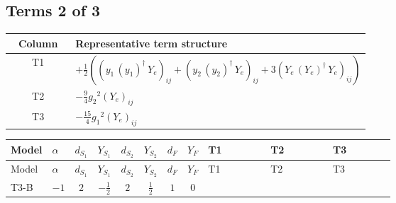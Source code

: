 \documentclass[8pt]{article}
\begin{document}
\begin{landscape}
\subsection*{Terms 2 of 3}
\begin{center}
\begin{tabular}{@{}c >{\raggedright\arraybackslash}p{0.82\linewidth}@{}}
\toprule
Column & Representative term structure \\
\midrule
T1 & \(\displaystyle +\frac{1}{2} (\left({y_1}\,\left({y_1}\right)^{\dagger}\,{Y_e}\right)_{ij}+\left({y_2}\,\left({y_2}\right)^{\dagger}\,{Y_e}\right)_{ij}+3 \left({Y_e}\,\left({Y_e}\right)^{\dagger}\,{Y_e}\right)_{ij})\) \\
\midrule
T2 & \(\displaystyle -\frac{9}{4} {g_2}^2 \left({Y_e}\right)_{ij}\) \\
\midrule
T3 & \(\displaystyle -\frac{15}{4} {g_1}^2 \left({Y_e}\right)_{ij}\) \\
\midrule
\bottomrule
\end{tabular}
\end{center}
\smallskip
\tiny
\begin{longtable}{@{}llcccccc >{\raggedright\arraybackslash}p{0.21\linewidth} >{\raggedright\arraybackslash}p{0.21\linewidth} >{\raggedright\arraybackslash}p{0.21\linewidth}@{}}
\toprule
Model & $\alpha$ & $d_{S_1}$ & $Y_{S_1}$ & $d_{S_2}$ & $Y_{S_2}$ & $d_F$ & $Y_F$ & T1 & T2 & T3 \\
\midrule
\endfirsthead
\toprule
Model & $\alpha$ & $d_{S_1}$ & $Y_{S_1}$ & $d_{S_2}$ & $Y_{S_2}$ & $d_F$ & $Y_F$ & T1 & T2 & T3 \\
\midrule
\endhead
T3-B & $-1$ & $2$ & $-\frac{1}{2}$ & $2$ & $\frac{1}{2}$ & $1$ & $0$ & \scriptsize\adjustbox{max width=\linewidth}{$\begin{gathered} +\frac{1}{2} (\left({y_1}\,\left({y_1}\right)^{\dagger}\,{Y_e}\right)_{ij}+\left({y_2}\,\left({y_2}\right)^{\dagger}\,{Y_e}\right)_{ij}+3 \left({Y_e}\,\left({Y_e}\right)^{\dagger}\,{Y_e}\right)_{ij})\end{gathered}$} & \scriptsize\adjustbox{max width=\linewidth}{$\begin{gathered} -\frac{9}{4} {g_2}^2 \left({Y_e}\right)_{ij}\end{gathered}$} & \scriptsize\adjustbox{max width=\linewidth}{$\begin{gathered} -\frac{15}{4} {g_1}^2 \left({Y_e}\right)_{ij}\end{gathered}$} \\
\midrule

\end{longtable}
\end{landscape}
\end{document}
